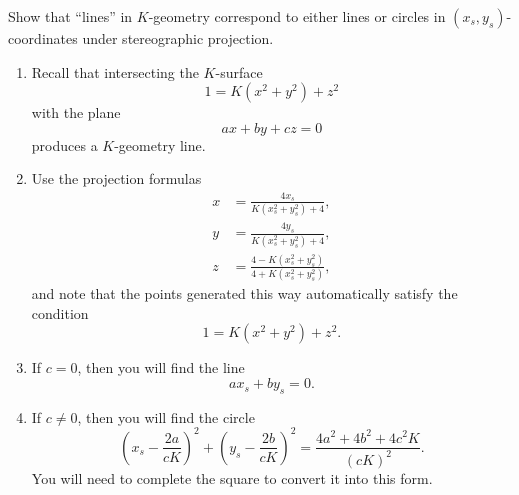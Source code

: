\documentclass[newpage,hints,handout]{ximera}
\begin{document}
\begin{problem}
  Show that ``lines'' in $K$-geometry correspond to either lines or circles in
  $(x_{s},y_{s})$-coordinates under stereographic projection.

\begin{hint}
\begin{enumerate}
\item Recall that intersecting the $K$-surface
  \[
  1 = K\left(x^2+y^2\right) + z^2 
  \]
  with the plane
  \[
  ax+by+cz = 0
  \]
  produces a $K$-geometry line.
\item Use the projection formulas
  \begin{align*}
      x &= \frac{4x_s}{K(x_s^2 + y_s^2) + 4},\\
      y &= \frac{4y_s}{K(x_s^2 + y_s^2) + 4},\\
      z &= \frac{4-K(x_s^2 + y_s^2)}{4+K(x_s^2 + y_s^2)},
  \end{align*}
  and note that the points generated this way automatically satisfy the condition
  \[
  1 = K(x^2+y^2) + z^2.
  \]
\item If $c=0$, then you will find the line
  \[
   ax_s + by_s = 0.
  \]
\item If $c\ne 0$, then you will find the circle
  \[
   \left(x_s - \frac{2a}{cK}\right)^2 + \left(y_s -
   \frac{2b}{cK}\right)^2 = \frac{4a^2 + 4b^2 + 4c^2K}{(cK)^2}.
   \]
   You will need to complete the square to convert it into this form.
\end{enumerate}
\end{hint}


\end{problem}
\end{document}
